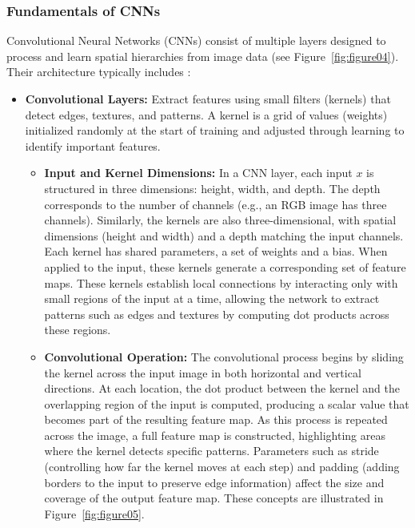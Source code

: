 \subsubsection{Fundamentals of CNNs}
Convolutional Neural Networks (CNNs) consist of multiple layers designed to process and learn spatial hierarchies from image data (see Figure~\ref{fig:figure04}). Their architecture typically includes \parencite{alzubaidi2021review}:

\begin{itemize}
    \item \textbf{Convolutional Layers:} Extract features using small filters (kernels) that detect edges, textures, and patterns. A kernel is a grid of values (weights) initialized randomly at the start of training and adjusted through learning to identify important features.
     
     \begin{itemize}
        \item \textbf{Input and Kernel Dimensions:} In a CNN layer, each input $x$ is structured in three dimensions: height, width, and depth. The depth corresponds to the number of channels (e.g., an RGB image has three channels). Similarly, the kernels are also three-dimensional, with spatial dimensions (height and width) and a depth matching the input channels. Each kernel has shared parameters, a set of weights and a bias. When applied to the input, these kernels generate a corresponding set of feature maps. These kernels establish local connections by interacting only with small regions of the input at a time, allowing the network to extract patterns such as edges and textures by computing dot products across these regions.
        \item \textbf{Convolutional Operation:} The convolutional process begins by sliding the kernel across the input image in both horizontal and vertical directions. At each location, the dot product between the kernel and the overlapping region of the input is computed, producing a scalar value that becomes part of the resulting feature map. As this process is repeated across the image, a full feature map is constructed, highlighting areas where the kernel detects specific patterns. Parameters such as stride (controlling how far the kernel moves at each step) and padding (adding borders to the input to preserve edge information) affect the size and coverage of the output feature map. These concepts are illustrated in Figure~\ref{fig:figure05}.
     \end{itemize}   
    

\end{itemize}
